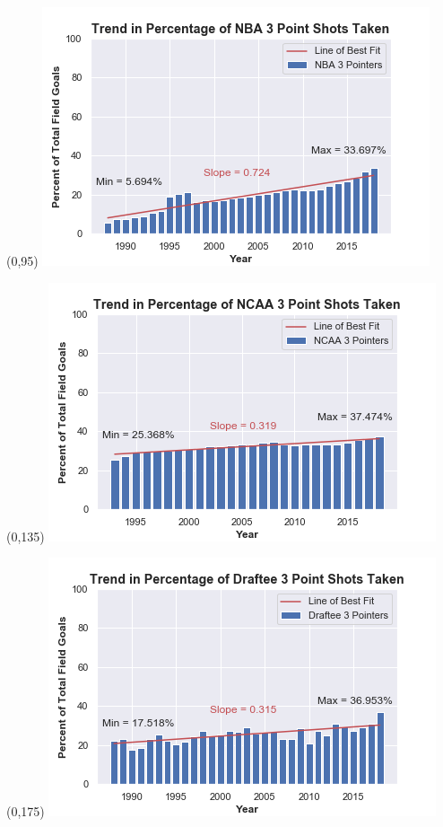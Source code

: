 \documentclass{article}
\begin{document}
\begin{textblock}{60}(0,95)
      \includegraphics[width=\linewidth]{3pt_taken_nba.png}
    \end{textblock}
    
\begin{textblock}{60}(0,135)
      \includegraphics[width=\linewidth]{3pt_taken_ncaa.png}
    \end{textblock}
    
\begin{textblock}{60}(0,175)
      \includegraphics[width=\linewidth]{3pt_taken_df.png}
    \end{textblock}
    
\end{document}
